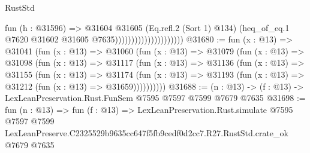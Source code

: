 \begin{lexlean}{RustStd}
\begin{coremodule}
                                          fun (h : @31596) =>
                                          @31604
                                            @31605
                                            (Eq.refl.{2} (Sort 1) @134)
                                            (heq_of_eq.{1}
                                              @7620
                                              @31602
                                              @31605
                                              @7635)))))))))))))))))))))
@31680 := fun (x : @13) =>
  @31041
    (fun (x : @13) =>
    @31060
      (fun (x : @13) =>
      @31079
        (fun (x : @13) =>
        @31098
          (fun (x : @13) =>
          @31117
            (fun (x : @13) =>
            @31136
              (fun (x : @13) =>
              @31155
                (fun (x : @13) =>
                @31174
                  (fun (x : @13) =>
                  @31193 (fun (x : @13) => @31212 (fun (x : @13) => @31659))))))))))
@31688 := (n : @13) -> (f : @13) -> LexLeanPreservation.Rust.FunSem @7595 @7597 @7599 @7679 @7635
@31698 := fun (n : @13) =>
  fun (f : @13) =>
  LexLeanPreservation.Rust.simulate
    @7595
    @7597
    @7599
    LexLeanPreserve.C2325529b9635cc647f5fb9cedf0d2cc7.R27.RustStd.crate_ok
    @7679
    @7635
\end{coremodule}
\end{lexlean}
